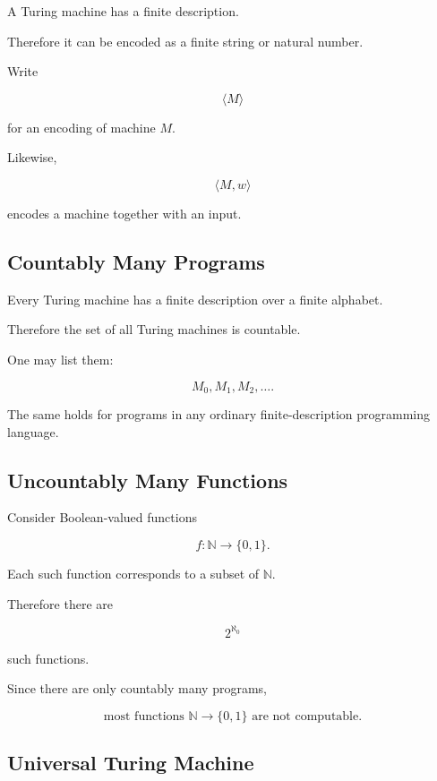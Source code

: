 A Turing machine has a finite description.

Therefore it can be encoded as a finite string or natural number.

Write

\[
\boxed{
\langle M\rangle
}
\]

for an encoding of machine \(M\).

Likewise,

\[
\boxed{
\langle M,w\rangle
}
\]

encodes a machine together with an input.

\subsection{Countably Many Programs}
\label{subsec:countably-many-programs}

Every Turing machine has a finite description over a finite alphabet.

Therefore the set of all Turing machines is countable.

One may list them:

\[
\boxed{
M_0,M_1,M_2,\ldots.
}
\]

The same holds for programs in any ordinary finite-description programming
language.

\subsection{Uncountably Many Functions}
\label{subsec:uncountably-many-functions}

Consider Boolean-valued functions

\[
f:\mathbb{N}\to\{0,1\}.
\]

Each such function corresponds to a subset of \(\mathbb{N}\).

Therefore there are

\[
\boxed{
2^{\aleph_0}
}
\]

such functions.

Since there are only countably many programs,

\[
\boxed{
\text{most functions }\mathbb{N}\to\{0,1\}
\text{ are not computable}.
}
\]

\subsection{Universal Turing Machine}
\label{subsec:universal-turing-machine}

